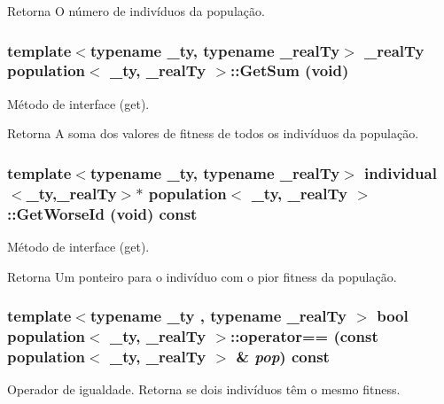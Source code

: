 \begin{DoxyReturn}{Retorna}
O número de indivíduos da população. 
\end{DoxyReturn}
\hypertarget{classpopulation_ac7e0fd101523d1f1db34ae3484a30bf3}{
\subsubsection[{GetSum}]{\setlength{\rightskip}{0pt plus 5cm}template$<$typename \_\-ty, typename \_\-realTy$>$ \_\-realTy {\bf population}$<$ \_\-ty, \_\-realTy $>$::GetSum (void)}}
\label{classpopulation_ac7e0fd101523d1f1db34ae3484a30bf3}
Método de interface (get).

\begin{DoxyReturn}{Retorna}
A soma dos valores de fitness de todos os indivíduos da população. 
\end{DoxyReturn}
\hypertarget{classpopulation_a251eb4e8235f4c456e2940fe4a0e4678}{
\subsubsection[{GetWorseId}]{\setlength{\rightskip}{0pt plus 5cm}template$<$typename \_\-ty, typename \_\-realTy$>$ {\bf individual}$<$\_\-ty,\_\-realTy$>$$\ast$ {\bf population}$<$ \_\-ty, \_\-realTy $>$::GetWorseId (void) const}}
\label{classpopulation_a251eb4e8235f4c456e2940fe4a0e4678}
Método de interface (get).

\begin{DoxyReturn}{Retorna}
Um ponteiro para o indivíduo com o pior fitness da população. 
\end{DoxyReturn}
\hypertarget{classpopulation_a1a847bb47928abf5a0d0a7e4a2ec8c5f}{
\subsubsection[{operator==}]{\setlength{\rightskip}{0pt plus 5cm}template$<$typename \_\-ty , typename \_\-realTy $>$ bool {\bf population}$<$ \_\-ty, \_\-realTy $>$::operator== (const {\bf population}$<$ \_\-ty, \_\-realTy $>$ \& {\em pop}) const}}
\label{classpopulation_a1a847bb47928abf5a0d0a7e4a2ec8c5f}
Operador de igualdade. Retorna se dois indivíduos têm o mesmo fitness.

